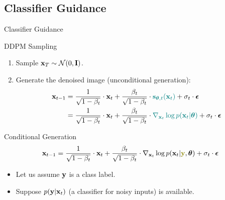 \documentclass{beamer}
\begin{document}
\subsection{Classifier Guidance}
\begin{frame}{Classifier Guidance}
	\begin{block}{DDPM Sampling}
		\begin{enumerate}
			\item Sample $\mathbf{x}_T \sim \mathcal{N}(0, \mathbf{I})$.
			\item Generate the denoised image (unconditional generation):
			\vspace{-0.3cm}
			\begin{align*}
				\mathbf{x}_{t - 1} &= \frac{1}{\sqrt{1 - \beta_t}} \cdot \mathbf{x}_t + \frac{\beta_t}{\sqrt{1 - \beta_t}} \cdot {\color{teal}\mathbf{s}_{\boldsymbol{\theta}, t} (\mathbf{x}_t)} +  \sigma_t \cdot \boldsymbol{\epsilon} \\
				& = \frac{1}{\sqrt{1 - \beta_t}} \cdot \mathbf{x}_t + \frac{\beta_t}{\sqrt{1 - \beta_t}} \cdot {\color{teal} \nabla_{\mathbf{x}_t} \log p(\mathbf{x}_t | \boldsymbol{\theta})} +  \sigma_t \cdot \boldsymbol{\epsilon}
			\end{align*}
			\vspace{-0.5cm}
		\end{enumerate}
	\end{block}
	\begin{block}{Conditional Generation}
		\vspace{-0.5cm}
		\[
			\bx_{t - 1} = \frac{1}{\sqrt{1 - \beta_t}}\cdot \bx_t +  \frac{\beta_t}{\sqrt{1 - \beta_t}}  \cdot  \nabla_{\bx_t} \log p(\bx_t | {\color{olive}\by}, \btheta) +  \sigma_t \cdot \bepsilon
		\]
		\vspace{-0.5cm}
	\end{block}
	\begin{itemize}
		\item Let us assume $\mathbf{y}$ is a class label.
		\item Suppose $p(\mathbf{y} | \mathbf{x}_t)$ (a classifier for noisy inputs) is available.
	\end{itemize}
\end{frame}
\end{document}
